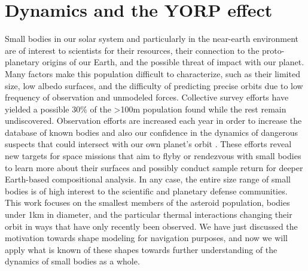 \section{Dynamics and the YORP effect}
Small bodies in our solar system and particularly in the near-earth environment are of interest to scientists for their resources, their connection to the proto-planetary origins of our Earth, and the possible threat of impact with our planet. Many factors make this population difficult to characterize, such as their limited size, low albedo surfaces, and the difficulty of predicting precise orbits due to low frequency of observation and unmodeled forces. Collective survey efforts have yielded a possible $30\%$ of the >100m population found while the rest remain undiscovered. Observation efforts are increased each year in order to increase the database of known bodies and also our confidence in the dynamics of dangerous suspects that could intersect with our own planet's orbit \citep{Jones2016}\citep{Mainzer2011}. These efforts reveal new targets for space missions that aim to flyby or rendezvous with small bodies to learn more about their surfaces and possibly conduct sample return for deeper Earth-based compositional analysis. In any case, the entire size range of small bodies is of high interest to the scientific and planetary defense communities. This work focuses on the smallest members of the asteroid population, bodies under 1km in diameter, and the particular thermal interactions changing their orbit in ways that have only recently been observed. We have just discussed the motivation towards shape modeling for navigation purposes, and now we will apply what is known of these shapes towards further understanding of the dynamics of small bodies as a whole. 

